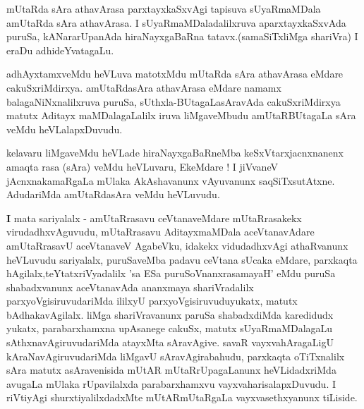 \centerline{}

\begin{artha}
mUtaRda sAra athavArasa parxtayxkaSxvAgi tapisuva sUyaRmaMDala
\-amUtaRda sAra athavArasa. I sUyaRmaMDaladalilxruva aparxtayxkaSxvAda
puruSa, kANararUpanAda hiraNayxgaBaRna tatavx.(samaSiTxliMga shariVra)
I eraDu adhideYvatagaLu.

adhAyxtamxveMdu heVLuva matotxMdu mUtaRda sAra athavArasa eMdare
cakuSxriMdirxya. amUtaRdasAra athavArasa eMdare namamx
balagaNiNxnalilxruva puruSa, sUthxla-BUtagaLasAravAda cakuSxriMdirxya
matutx Aditayx maMDalagaLalilx iruva liMgaveMbudu amUtaRBUtagaLa sAra
veMdu heVLalapxDuvudu.
\end{artha}

\centerline{}

\begin{artha}
kelavaru liMgaveMdu heVLade hiraNayxgaBaRneMba keSxVtarxjacnxnanenx
amaqta rasa (sAra) veMdu heVLuvaru, EkeMdare ! I jiVvaneV
jAcnxnakamaRgaLa mUlaka AkAshavanunx vAyuvanunx
saqSiTxsutAtxne. AdudariMda amUtaRdasAra veMdu heVLuvudu.
\end{artha}

\begin{artha}
{\textbf I mata sariyalalx -} amUtaRrasavu ceVtanaveMdare
mUtaRrasakekx virudadhx\-vAguvudu, mUtaRrasavu AditayxmaMDala
aceVtanavAdare amUtaRrasavU aceVtanaveV AgabeVku, idakekx
vidudadhxvAgi athaRvanunx heVLuvudu sariyalalx, puruSaveMba padavu
ceVtana sUcaka eMdare, parxkaqta hAgilalx,teYtatxriVyadalilx 'sa ESa puruSoV\s nanxrasamayaH'
eMdu puruSa shabadxvanunx aceVtanavAda ananxmaya shariVradalilx
parxyoVgisiruvudariMda ililxyU parxyoVgisiruvuduyukatx, matutx
bAdhakavAgilalx. liMga shariVravanunx paruSa shabadxdiMda karedidudx
yukatx, parabarxhamxna upAsanege cakuSx, matutx sUyaRmaMDalagaLu
sAthxnavAgiruvudariMda atayxMta sAravAgive. savaR vayxvahAragaLigU
kAraNavAgiruvudariMda liMgavU sAravAgirabahudu, parxkaqta oTiTxnalilx
sAra matutx asAravenisida mUtAR mUtaRrUpagaLanunx heVLidadxriMda
avugaLa mUlaka rUpavilalxda parabarxhamxvu vayxvaharisalapxDuvudu. I riVtiyAgi shurxtiyalilxdadxMte mUtARmUtaRgaLa vayxvasethxyanunx tiLiside.
\end{artha}

\centerline{}
	
